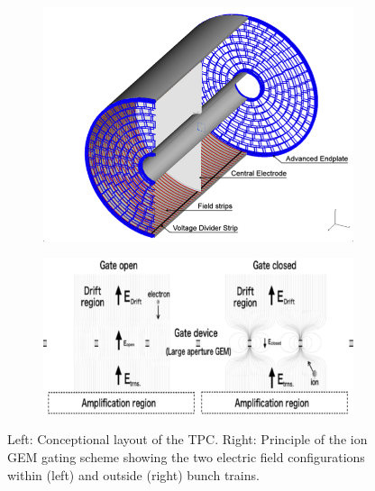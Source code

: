 \begin{figure}[t!]
\begin{subfigure}{0.45\textwidth}
\includegraphics[width=1\hsize]{Detector/fig/TPC.png}
\end{subfigure}
\begin{subfigure}{0.45\textwidth}
\includegraphics[width=1\hsize]{Detector/fig/gate.jpg}
\end{subfigure}
\caption[TPC layout]{Left: Conceptional layout of the TPC. Right: Principle of the ion GEM gating scheme showing the two electric field configurations within (left) and outside (right) bunch trains.}
\label{fig:det:TPC}
\end{figure}

